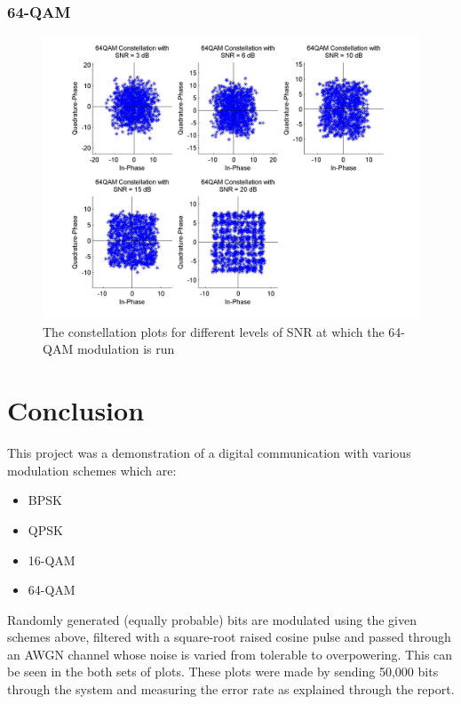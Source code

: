 \documentclass[]{article}
\begin{document}
\subsubsection{64-QAM}
\begin{figure}[H]
\centering
\hspace*{-2cm}\includegraphics[width=1.3\textwidth]{qam64Const.jpg}
\caption{The constellation plots for different levels of SNR at which the 64-QAM modulation is run}
\end{figure}

\newpage

\section{Conclusion}
\label{sec:conc}
This project was a demonstration of a digital communication with various modulation schemes which are:
\begin{itemize}
\item BPSK
\item QPSK
\item 16-QAM
\item 64-QAM
\end{itemize}

Randomly generated (equally probable) bits are modulated using the given schemes above, filtered with a square-root raised cosine pulse and passed through an AWGN channel whose noise is varied from tolerable to overpowering.  This can be seen in the both sets of plots.  These plots were made by sending 50,000 bits through the system and measuring the error rate as explained through the report.
\end{document}

